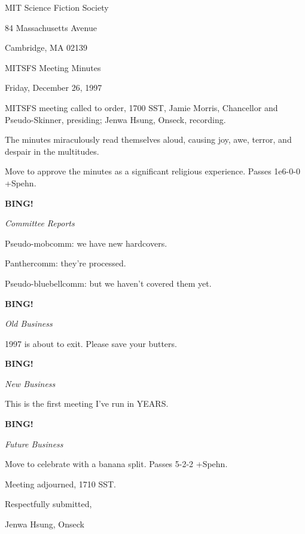 \documentclass[12pt]{article}
\newcommand{\bing}{{\bf BING!} }
\newcommand{\goto}[1]{\bing \vskip 12pt \centerline{{\em{#1}}}}
\begin{document}
\begin{center}

MIT Science Fiction Society 

84 Massachusetts Avenue

Cambridge, MA 02139

\vspace{12pt}

MITSFS Meeting Minutes 

Friday, December 26, 1997

\end{center}
 
\vspace{18pt}

\setlength{\parskip}{6pt}

\noindent
MITSFS meeting called to order, 1700 SST,
Jamie Morris, Chancellor and Pseudo-Skinner, presiding; Jenwa Hsung, Onseck, recording.

The minutes miraculously read themselves aloud, causing joy, awe, terror, and despair in the multitudes.

Move to approve the minutes as a significant religious experience. Passes 1e6-0-0 +Spehn.

\goto{Committee Reports}

Pseudo-mobcomm: we have new hardcovers.

Panthercomm: they're processed.

Pseudo-bluebellcomm: but we haven't covered them yet.

\goto{Old Business}

1997 is about to exit. Please save your butters.

\goto{New Business}

This is the first meeting I've run in YEARS.

\goto{Future Business}

Move to celebrate with a banana split. Passes 5-2-2 +Spehn.

\vspace{12pt}

\noindent
Meeting adjourned, 1710 SST.

\vspace{18pt}

\centerline{Respectfully submitted,}
\centerline{Jenwa Hsung, Onseck}
\end{document}
